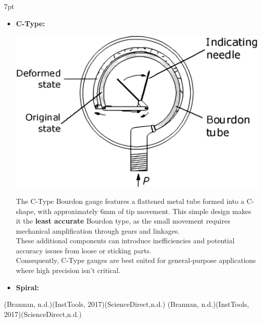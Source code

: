 \documentclass{article}
\newcommand{\formalsource}{} %
\newenvironment{formal}[3][]{%
	\renewcommand{\formalsource}{#1}%
	\def\FrameCommand{%
		\hspace{1pt}%
		{\color{#2}\vrule width 2pt}%
		{\color{#3}\vrule width 4pt}%
		\colorbox{#3}%
	}%
	\MakeFramed{\advance\hsize-\width\FrameRestore}%
	\noindent\hspace{-4.55pt}%
	\begin{adjustwidth}{}{7pt}%
		\vspace{2pt}%
	}%
	{%
		\vspace{4pt}%
		\ifx\formalsource\empty %
		\else
		\hfill{\footnotesize{\formalsource}}%
		\fi
	\end{adjustwidth}\endMakeFramed%
}
\begin{document}
\begin{formal}[(Brannan, n.d.)(InstTools, 2017)(ScienceDirect,n.d.)]{black!60!white}{white!93!gray}
\begin{itemize}
	\item \textbf{C-Type:}\\[8pt]
	\begin{minipage}{0.3\textwidth}\centering\hspace*{-1em}
		\includegraphics[width=1.1\textwidth]{images/ezgif-42a6b97cab4453(2)-Photoroom.png}
	\end{minipage}\hfill
	\begin{minipage}{0.6\textwidth}
		The C-Type Bourdon gauge features a flattened metal tube formed into a C-shape, with approximately 6mm of tip movement. This simple design makes it the \textbf{least accurate} Bourdon type, as the small movement requires mechanical amplification through gears and linkages.\\[5pt]
		These additional components can introduce inefficiencies and potential accuracy issues from loose or sticking parts.\\[5pt]
		Consequently, C-Type gauges are best suited for general-purpose applications where high precision isn't critical.
	\end{minipage}
   \item \textbf{Spiral:}\\[8pt]
	\begin{minipage}{0.3\textwidth}\centering

\end{minipage}
\end{itemize}
\end{formal}
\end{document}
